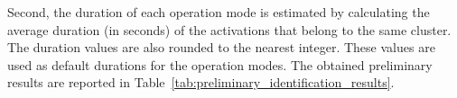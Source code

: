 Second, the duration of each operation mode is estimated by calculating the average duration (in seconds) of the activations that belong to the same cluster. The duration values are also rounded to the nearest integer. These values are used as default durations for the operation modes. The obtained preliminary results are reported in Table~\ref{tab:preliminary_identification_results}.

\begin{table}[hbt]
  \centering
\end{table}
